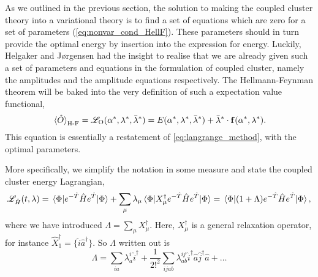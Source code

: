 As we outlined in the previous section, the solution to making the coupled cluster 
theory into a variational theory is to find a set of equations which are zero for a set
of parameters (\autoref{eq:nonvar_cond_HellF}). These parameters should in turn provide the optimal energy by insertion 
into the expression for energy. Luckily, Helgaker and 
Jørgensen\cite{helgaker1988analytical,helgaker1989configuration} had the insight to 
realise that we are already given such a set of parameters and equations in the 
formulation of coupled cluster, namely the amplitudes and the amplitude equations
respectively. The Hellmann-Feynman theorem will be baked into the very definition 
of such a expectation value functional,
\begin{equation}
    \ev*{\hat{O}}_{\text{H-F}} 
        = \mathscr{L}_{\text{O}}(\alpha^*, \vb{\lambda}^*, \bar{\vb{\lambda}}^*)
        = E(\alpha^*, \vb{\lambda}^*, \bar{\vb{\lambda}}^*)
        + \bar{\vb{\lambda}}^* \cdot \vb{f}(\alpha^*, \vb{\lambda}^*).
\end{equation}
This equation is essentially a restatement of \autoref{eq:langrange_method}, with  
the optimal parameters.

More specifically, we simplify the notation in some measure and state the coupled
cluster energy Lagrangian,
\begin{equation}
    \label{eq:cc_energy_lagrangian}
    \mathscr{L}_{\hat{H}}(t, \lambda) 
        = \mel{\Phi}{e^{-\hat{T}}\hat{H}e^{\hat{T}}}{\Phi}
        + \sum_\mu \lambda_\mu \mel{\Phi}{X_\mu^\dagger e^{-\hat{T}} \hat{H} e^{\hat{T}}}{\Phi}
        = \mel{\Phi}{(1 + \Lambda)e^{-\hat{T}}\hat{H}e^{\hat{T}} }{\Phi},
\end{equation}
where we have introduced $\Lambda = \sum_\mu X^\dagger_\mu$. Here, $X^\dagger_\mu$ is a
general relaxation operator, for instance $\hat{X}_1^\dagger = \{\hat{i}\hat{a}^\dagger\}$.
So $\Lambda$ written out is 
\begin{equation}
    \label{eq:capital_lambda}
    \Lambda = \sum_{ia}\lambda^i_a \hat{i}^\dagger 
    + \frac{1}{2!^2}\sum_{ijab} 
        \lambda^{ij}_{ab} \hat{i}^\dagger \hat{a} \hat{j}^\dagger \hat{a}
    + \dots
\end{equation}

